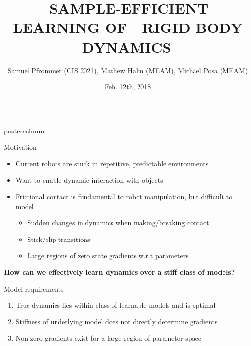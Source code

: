 \documentclass[final,hyperref={pdfpagelabels=false},5pt]{beamer}
\title{{\noindent  \,SAMPLE-EFFICIENT LEARNING OF \, \linebreak \,RIGID BODY DYNAMICS\, \linebreak} }
\author{Samuel Pfrommer (CIS 2021), Mathew Halm (MEAM), Michael Posa (MEAM)}
\institute[University of Pennsylvania]{PURM --- DAIR Laboratory --- University of Pennsylvania}
\date{Feb. 12th, 2018}
\newlength{\columnheight}
\begin{document}
\begin{frame}
  \vspace{-26ex}
    \begin{columns}
    \begin{column}{.49\textwidth}
      \begin{beamercolorbox}[center,wd=\textwidth]{postercolumn}
        \begin{minipage}[T]{.95\textwidth}  %
          \parbox[t][\columnheight]{\textwidth}{ %
            \begin{block}{Motivation}
              \color{penndkbl}
                    \begin{itemize}
                        \item Current robots are stuck in repetitive, predictable environments
                        \item Want to enable dynamic interaction with objects
                        \item Frictional contact is fundamental to robot manipulation, but difficult to model
                            \begin{itemize}
                                \item Sudden changes in dynamics when making/breaking contact 
                                \item Stick/slip transitions
                                \item Large regions of zero state gradients w.r.t parameters
                            \end{itemize}
                    \end{itemize}

                \begin{center}
                    \textbf{How can we effectively learn dynamics over a stiff class of models?}
                \end{center}
              \end{block}

              \begin{block}{Model requirements}
                \begin{enumerate}
                    \item True dynamics lies within class of learnable models and is optimal
                    \item Stiffness of underlying model does not directly determine gradients 
                    \item Non-zero gradients exist for a large region of parameter space
                \end{enumerate}
              \end{block}
                      
}
\end{minipage}
\end{beamercolorbox}
\end{column}
\end{columns}
\end{frame}
\end{document}

